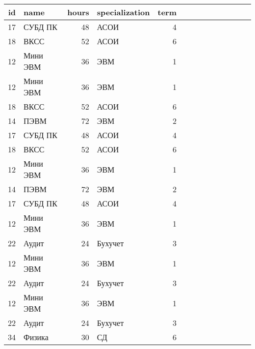 \begin{tabular}{rlrlrrrrrrlrll}
\toprule
id & name & hours & specialization & term \\
\midrule
17 & СУБД ПК & 48 & АСОИ & 4 \\
18 & ВКСС & 52 & АСОИ & 6 \\
12 & Мини ЭВМ & 36 & ЭВМ & 1 \\
12 & Мини ЭВМ & 36 & ЭВМ & 1 \\
18 & ВКСС & 52 & АСОИ & 6 \\
14 & ПЭВМ & 72 & ЭВМ & 2 \\
17 & СУБД ПК & 48 & АСОИ & 4 \\
18 & ВКСС & 52 & АСОИ & 6 \\
12 & Мини ЭВМ & 36 & ЭВМ & 1 \\
14 & ПЭВМ & 72 & ЭВМ & 2 \\
17 & СУБД ПК & 48 & АСОИ & 4 \\
12 & Мини ЭВМ & 36 & ЭВМ & 1 \\
22 & Аудит & 24 & Бухучет & 3 \\
12 & Мини ЭВМ & 36 & ЭВМ & 1 \\
22 & Аудит & 24 & Бухучет & 3 \\
12 & Мини ЭВМ & 36 & ЭВМ & 1 \\
22 & Аудит & 24 & Бухучет & 3 \\
34 & Физика & 30 & СД & 6 \\
\bottomrule
\end{tabular}
